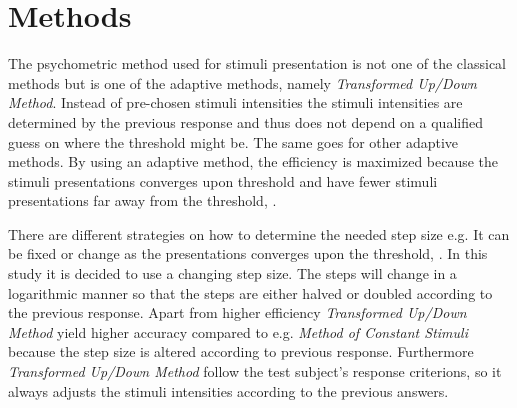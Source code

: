 \section*{Methods}
\label{Methods}
%
The psychometric method used for stimuli presentation is not one of the classical methods but is one of the adaptive methods, namely \textit{Transformed Up/Down Method}. Instead of pre-chosen stimuli intensities the stimuli intensities are determined by the previous response and thus does not depend on a qualified guess on where the threshold might be. The same goes for other adaptive methods. By using an adaptive method, the efficiency is maximized because the stimuli presentations converges upon threshold and have fewer stimuli presentations far away from the threshold, \parencite[p. 287]{PDF:Hearing}.

There are different strategies on how to determine the needed step size e.g. It can be fixed or change as the presentations converges upon the threshold, \parencite[p. 22]{PDF:Psychoacoustic}. In this study it is decided to use a changing step size. The steps will change in a logarithmic manner so that the steps are either halved or doubled according to the previous response. Apart from higher efficiency \textit{Transformed Up/Down Method} yield higher accuracy compared to e.g. \textit{Method of Constant Stimuli} because the step size is altered according to previous response. Furthermore \textit{Transformed Up/Down Method} follow the test subject's response criterions, so it always adjusts the stimuli intensities according to the previous answers.  

